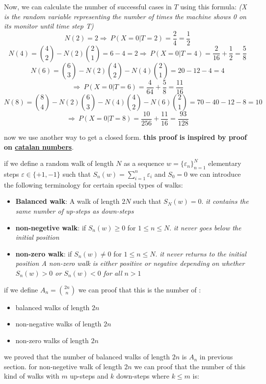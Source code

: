 \begin{qsolve}
\begin{qsolve}[]
		Now, we can calculate the number of successful cases in $T$ using this formula: \textit{(X is the random variable representing the number of times the machine shows 0 on its monitor until time step T)}
				\[N(2) = 2 \Rightarrow \ P(X = 0|T = 2) = \dfrac{2}{4} = \dfrac{1}{2}\]
				\[N(4) = \binom{4}{2} - N(2)\binom{2}{1} = 6 - 4 = 2 \Rightarrow \ P(X = 0|T = 4) = \dfrac{2}{16} + \dfrac{1}{2} = \dfrac{5}{8}\]
				$$N(6) = \binom{6}{3} - N(2)\binom{4}{2} - N(4)\binom{2}{1} = 20 - 12 - 4 = 4$$
				$$\Rightarrow \ P(X = 0|T = 6) = \dfrac{4}{64} + \dfrac{5}{8} = \dfrac{11}{16}$$
				$$N(8) = \binom{8}{4} - N(2)\binom{6}{3} - N(4)\binom{4}{2} - N(6)\binom{2}{1} = 70 - 40 - 12 - 8 = 10$$ 
				$$ \Rightarrow \ P(X = 0|T = 8) = \dfrac{10}{256} + \dfrac{11}{16} = \dfrac{93}{128}$$
	\end{qsolve}
	now we use another way to get a closed form. \textbf{this proof is inspired by proof on \href{https://en.wikipedia.org/wiki/Catalan_number}{catalan numbers}}.
	\begin{qsolve}[]
		if we define a random walk of length $N$ as a sequence $w = \{\varepsilon _n\}_{n = 1}^{N} $ elementary steps $\varepsilon \in \{+1 , -1\}$ such that $S_n(w) = \sum_{i=1}^n \varepsilon _i$ and $S_0 = 0$ we can introduce the following terminology for certain special types of walks:
		\splitqsolve[\splitqsolve]
		\begin{itemize}
			\item \textbf{Balanced walk}: A walk of length $2N$ such that $S_N(w) = 0$. \textit{it contains the same number of up-steps as down-steps}
			\item \textbf{non-negetive walk}: if $S_n(w) \geq 0$ for $1\leq n \leq N$. \textit{it never goes below the initial position}
			\item \textbf{non-zero walk}: if $S_n(w) \neq 0$ for $1\leq n \leq N$. \textit{it never returns to the initial position A non-zero walk is either positive or negative depending on whether $S_n(w) > 0$ or $S_n(w) < 0$ for all $n > 1$}
		\end{itemize}
		if we define $A_n = \binom{2n}{n}$ we can proof that this is the number of :
		\begin{itemize}
			\item balanced walks of length $2n$
			\item non-negative walks of length $2n$
			\item non-zero walks of length $2n$
		\end{itemize}
		we proved that the number of balanced walks of length $2n$ is $A_n$ in previous section. for non-negetive walk of length $2n$ we can proof that the number of this kind of walks with $m$ up-steps and $k$ down-steps where $k\leq m$ is:

\end{qsolve}
\end{qsolve}
